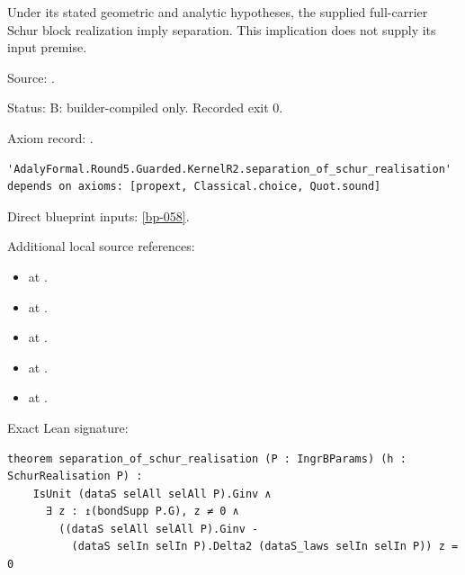 \begin{theorem}[bp-250]
\label{bp-250}
\leanok
Under its stated geometric and analytic hypotheses, the supplied full-carrier Schur block realization imply separation. This implication does not supply its input premise.

\par Source: \texttt{}.
\par Status: B: builder-compiled only. Recorded exit 0.
\par Axiom record: \texttt{}.
\begin{verbatim}
'AdalyFormal.Round5.Guarded.KernelR2.separation_of_schur_realisation' depends on axioms: [propext, Classical.choice, Quot.sound]
\end{verbatim}
\par Direct blueprint inputs: \ref{bp-058}.
\par Additional local source references:
\begin{itemize}
\item \texttt{} at \texttt{}.
\item \texttt{} at \texttt{}.
\item \texttt{} at \texttt{}.
\item \texttt{} at \texttt{}.
\item \texttt{} at \texttt{}.
\end{itemize}
\par Exact Lean signature:
\begin{verbatim}
theorem separation_of_schur_realisation (P : IngrBParams) (h : SchurRealisation P) :
    IsUnit (dataS selAll selAll P).Ginv ∧
      ∃ z : ↥(bondSupp P.G), z ≠ 0 ∧
        ((dataS selAll selAll P).Ginv -
          (dataS selIn selIn P).Delta2 (dataS_laws selIn selIn P)) z = 0
\end{verbatim}
\end{theorem}

